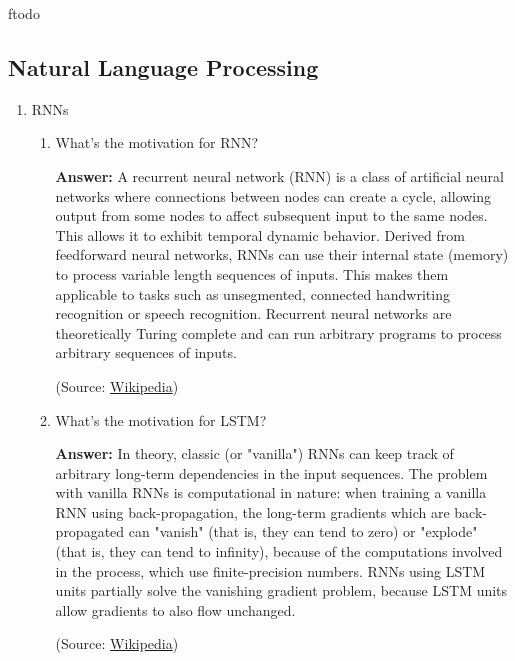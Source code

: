 ƒtodo\documentclass{article}
\newenvironment{QandA}{\begin{enumerate}[label=\arabic*.]}{\end{enumerate}}
\newenvironment{InnerQandA}{\begin{enumerate}[label=\roman*.]}{\end{enumerate}}
\newenvironment{answer}{\par\normalfont \textbf{Answer:}}{}
\begin{document}
\subsection{Natural Language Processing}
\begin{QandA}
    \item RNNs
    \begin{InnerQandA}
        \item What’s the motivation for RNN?
        \begin{answer}
            A recurrent neural network (RNN) is a class of artificial neural networks where connections between nodes can create a cycle, allowing output from some nodes to affect subsequent input to the same nodes. This allows it to exhibit temporal dynamic behavior. Derived from feedforward neural networks, RNNs can use their internal state (memory) to process variable length sequences of inputs. This makes them applicable to tasks such as unsegmented, connected handwriting recognition or speech recognition. Recurrent neural networks are theoretically Turing complete and can run arbitrary programs to process arbitrary sequences of inputs.

            (Source: \href{https://en.wikipedia.org/wiki/Recurrent_neural_network}{Wikipedia})
        \end{answer}
        
        \item What’s the motivation for LSTM?
        \begin{answer}
            In theory, classic (or "vanilla") RNNs can keep track of arbitrary long-term dependencies in the input sequences. The problem with vanilla RNNs is computational in nature: when training a vanilla RNN using back-propagation, the long-term gradients which are back-propagated can "vanish" (that is, they can tend to zero) or "explode" (that is, they can tend to infinity), because of the computations involved in the process, which use finite-precision numbers. RNNs using LSTM units partially solve the vanishing gradient problem, because LSTM units allow gradients to also flow unchanged. 

            (Source: \href{https://en.wikipedia.org/wiki/Long_short-term_memory}{Wikipedia})
        \end{answer}
        

\end{InnerQandA}
\end{QandA}
\end{document}
